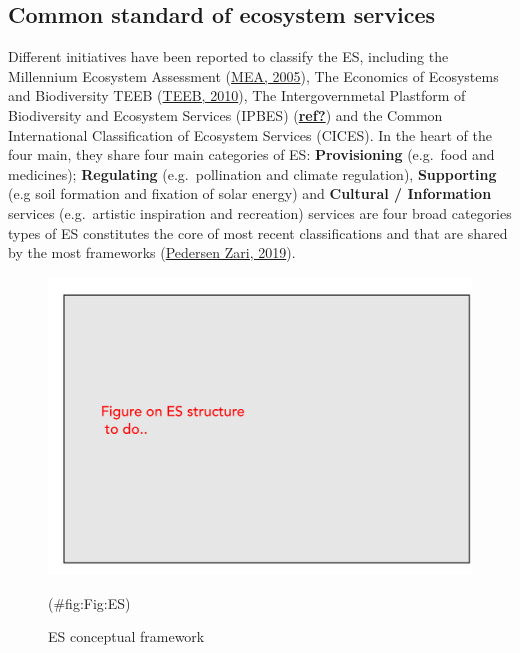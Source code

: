 \documentclass[]{elsarticle} %
\begin{document}
\hypertarget{common-standard-of-ecosystem-services}{%
\subsection{Common standard of ecosystem services}\label{common-standard-of-ecosystem-services}}

Different initiatives have been reported to classify the ES, including the Millennium Ecosystem Assessment (\protect\hyperlink{ref-MEA2005}{MEA, 2005}),
The Economics of Ecosystems and Biodiversity TEEB (\protect\hyperlink{ref-TEEB2010}{TEEB, 2010}),
The Intergovernmetal Plastform of Biodiversity and Ecosystem Services (IPBES) (\protect\hyperlink{ref-ref}{\textbf{ref?}}) and the Common International Classification of Ecosystem Services (CICES).
In the heart of the four main, they share four main categories of ES:
\textbf{Provisioning} (e.g.~food and medicines);
\textbf{Regulating} (e.g.~pollination and climate regulation),
\textbf{Supporting} (e.g soil formation and fixation of solar energy) and
\textbf{Cultural / Information} services (e.g.~artistic inspiration and recreation) services are four broad categories types of ES constitutes the core of most recent classifications and that are shared by the most frameworks (\protect\hyperlink{ref-PedersenZari2019}{Pedersen Zari, 2019}).

\begin{figure}[!ht]

{\centering \includegraphics[width=1\linewidth]{Figures/Comparison} 

}

\caption{ES conceptual framework}(\#fig:Fig:ES)
\end{figure}
\end{document}

